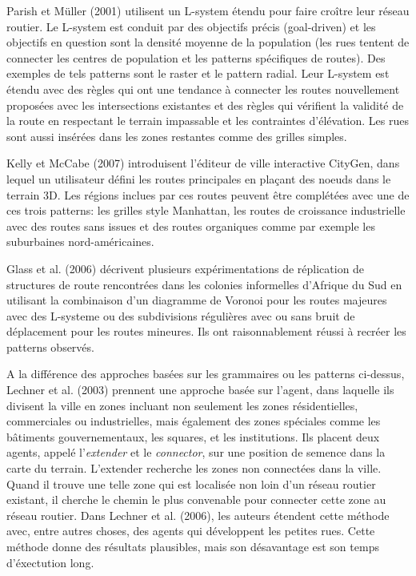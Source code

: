 \documentclass[11pt]{report}
\begin{document}
Parish et Müller (2001) utilisent un L-system étendu pour faire croître leur réseau routier. Le L-system est conduit par des objectifs précis (goal-driven) et les objectifs en question sont la densité moyenne de la population (les rues tentent de connecter les centres de population et les patterns spécifiques de routes). Des exemples de tels patterns sont le raster et le pattern radial. Leur L-system est étendu avec des règles qui ont une tendance à connecter les routes nouvellement proposées avec les intersections existantes et des règles qui vérifient la validité de la route en respectant le terrain impassable et les contraintes d'élévation. Les rues sont aussi insérées dans les zones restantes comme des grilles simples. \newline

Kelly et McCabe (2007) introduisent l'éditeur de ville interactive CityGen, dans lequel un utilisateur défini les routes principales en plaçant des noeuds dans le terrain 3D. Les régions inclues par ces routes peuvent être complétées avec une de ces trois patterns: les grilles style Manhattan, les routes de croissance industrielle avec des routes sans issues et des routes organiques comme par exemple les suburbaines nord-américaines. \newline

Glass et al. (2006) décrivent plusieurs expérimentations de réplication de structures de route rencontrées dans les colonies informelles d'Afrique du Sud en utilisant la combinaison d'un diagramme de Voronoi pour les routes majeures avec des L-systeme ou des subdivisions régulières avec ou sans bruit de déplacement pour les routes mineures. Ils ont raisonnablement réussi à recréer les patterns observés. \newline

A la différence des approches basées sur les grammaires ou les patterns ci-dessus, Lechner et al. (2003) prennent une approche basée sur l'agent, dans laquelle ils divisent la ville en zones incluant non seulement les zones résidentielles, commerciales ou industrielles, mais également des zones spéciales comme les bâtiments gouvernementaux, les squares, et les institutions. Ils placent deux agents, appelé l'\textit{extender} et le \textit{connector}, sur une position de semence dans la carte du terrain. L'extender recherche les zones non connectées dans la ville. Quand il trouve une telle zone qui est localisée non loin d'un réseau routier existant, il cherche le chemin le plus convenable pour connecter cette zone au réseau routier. Dans Lechner et al. (2006), les auteurs étendent cette méthode avec, entre autres choses, des agents qui développent les petites rues. Cette méthode donne des résultats plausibles, mais son désavantage est son temps d'éxectution long. \newline
\end{document}
